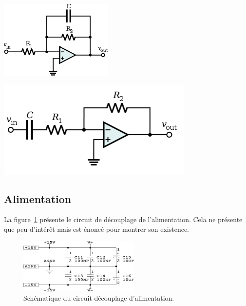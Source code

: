 \documentclass[10pt, oneside, a4paper]{article}
\begin{document}
\begin{minipage}[t]{.45\textwidth}
    \centering
    \includegraphics[height=110pt]{eps/active-lowpass-filter-rc.eps}
    \label{fig:filtreLowpass}
\end{minipage} \hfill
\begin{minipage}[t]{.45\textwidth}
    \centering
    \includegraphics[width=\textwidth]{image/active-highpass-filter-rc.png}
    \label{fig:filtreHighpass}
\end{minipage}

\subsection{Alimentation}
La figure~\ref{fig:alimDecouplage} présente le circuit de découplage de l'alimentation.
Cela ne présente que peu d'intérêt mais est énoncé pour montrer son existence.

\begin{figure}[!ht]
    \centering
    \includegraphics[width=6cm]{image/sch-alim.png}
    \caption{Schématique du circuit découplage d'alimentation.}
    \label{fig:alimDecouplage}
\end{figure}
\end{document}

